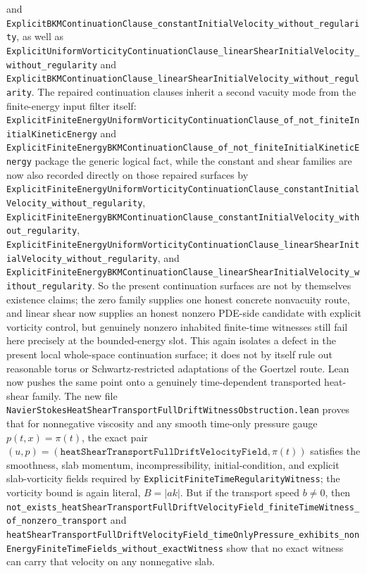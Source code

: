\documentclass[11pt]{article}
\begin{document}
and
\texttt{ExplicitBKMContinuationClause\_constantInitialVelocity\_without\_regularity},
as well as
\texttt{ExplicitUniformVorticityContinuationClause\_linearShearInitialVelocity\_without\_regularity}
and
\texttt{ExplicitBKMContinuationClause\_linearShearInitialVelocity\_without\_regularity}.
The repaired continuation clauses inherit a second vacuity mode from the
finite-energy input filter itself:
\texttt{ExplicitFiniteEnergyUniformVorticityContinuationClause\_of\_not\_finiteInitialKineticEnergy}
and
\texttt{ExplicitFiniteEnergyBKMContinuationClause\_of\_not\_finiteInitialKineticEnergy}
package the generic logical fact, while the constant and shear families are now
also recorded directly on those repaired surfaces by
\texttt{ExplicitFiniteEnergyUniformVorticityContinuationClause\_constantInitialVelocity\_without\_regularity},
\texttt{ExplicitFiniteEnergyBKMContinuationClause\_constantInitialVelocity\_without\_regularity},
\texttt{ExplicitFiniteEnergyUniformVorticityContinuationClause\_linearShearInitialVelocity\_without\_regularity},
and
\texttt{ExplicitFiniteEnergyBKMContinuationClause\_linearShearInitialVelocity\_without\_regularity}.
So the present continuation surfaces are not by themselves existence claims;
the zero family supplies one honest concrete nonvacuity route, and linear shear
now supplies an honest nonzero PDE-side candidate with explicit vorticity
control, but genuinely nonzero inhabited finite-time witnesses still fail here
precisely at the bounded-energy slot.  This again isolates a defect in the
present local whole-space continuation surface; it does not by itself rule out
reasonable torus or Schwartz-restricted adaptations of the Goertzel route.
Lean now pushes the same point onto a genuinely time-dependent transported
heat-shear family.  The new file
\texttt{NavierStokesHeatShearTransportFullDriftWitnessObstruction.lean} proves
that for nonnegative viscosity and any smooth time-only pressure gauge
\(p(t,x)=\pi(t)\), the exact pair
\((u,p) = (\texttt{heatShearTransportFullDriftVelocityField}, \pi(t))\)
satisfies the smoothness, slab momentum, incompressibility, initial-condition,
and explicit slab-vorticity fields required by
\texttt{ExplicitFiniteTimeRegularityWitness}; the vorticity bound is again
literal, \(B = |a k|\).  But if the transport speed \(b \neq 0\), then
\texttt{not\_exists\_heatShearTransportFullDriftVelocityField\_finiteTimeWitness\_of\_nonzero\_transport}
and
\texttt{heatShearTransportFullDriftVelocityField\_timeOnlyPressure\_exhibits\_nonEnergyFiniteTimeFields\_without\_exactWitness}
show that no exact witness can carry that velocity on any nonnegative slab.
\end{document}
